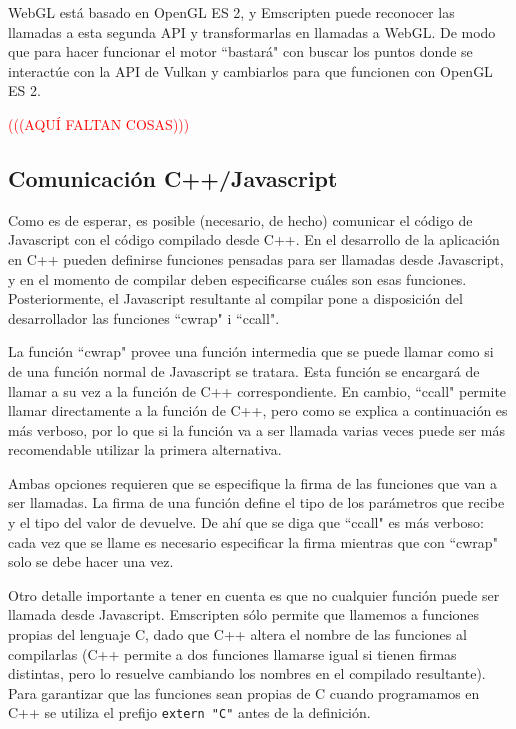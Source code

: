 WebGL está basado en OpenGL ES 2, y Emscripten puede reconocer las llamadas a esta segunda API y transformarlas en llamadas a WebGL. De modo que para hacer funcionar el motor ``bastará" con buscar los puntos donde se interactúe con la API de Vulkan y cambiarlos para que funcionen con OpenGL ES 2.

\textcolor{red}{(((AQUÍ FALTAN COSAS)))}

\subsection{Comunicación C++/Javascript}
\label{emscripten_comm}
Como es de esperar, es posible (necesario, de hecho) comunicar el código de Javascript con el código compilado desde C++. En el desarrollo de la aplicación en C++ pueden definirse funciones pensadas para ser llamadas desde Javascript, y en el momento de compilar deben especificarse cuáles son esas funciones. Posteriormente, el Javascript resultante al compilar pone a disposición del desarrollador las funciones ``cwrap" i ``ccall".

La función ``cwrap" provee una función intermedia que se puede llamar como si de una función normal de Javascript se tratara. Esta función se encargará de llamar a su vez a la función de C++ correspondiente. En cambio, ``ccall" permite llamar directamente a la función de C++, pero como se explica a continuación es más verboso, por lo que si la función va a ser llamada varias veces puede ser más recomendable utilizar la primera alternativa.

Ambas opciones requieren que se especifique la firma de las funciones que van a ser llamadas. La firma de una función define el tipo de los parámetros que recibe y el tipo del valor de devuelve. De ahí que se diga que ``ccall" es más verboso: cada vez que se llame es necesario especificar la firma mientras que con ``cwrap" solo se debe hacer una vez.

Otro detalle importante a tener en cuenta es que no cualquier función puede ser llamada desde Javascript. Emscripten sólo permite que llamemos a funciones propias del lenguaje C, dado que C++ altera el nombre de las funciones al compilarlas (C++ permite a dos funciones llamarse igual si tienen firmas distintas, pero lo resuelve cambiando los nombres en el compilado resultante). Para garantizar que las funciones sean propias de C cuando programamos en C++ se utiliza el prefijo \texttt{extern "C"} antes de la definición.

